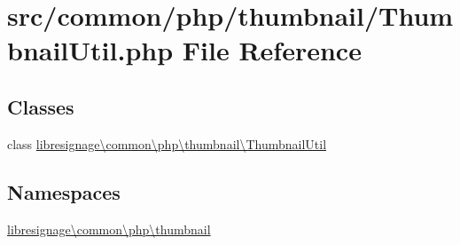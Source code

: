 \hypertarget{ThumbnailUtil_8php}{}\section{src/common/php/thumbnail/\+Thumbnail\+Util.php File Reference}
\label{ThumbnailUtil_8php}
\subsection*{Classes}
\begin{DoxyCompactItemize}
\item 
class \hyperlink{classlibresignage_1_1common_1_1php_1_1thumbnail_1_1ThumbnailUtil}{libresignage\textbackslash{}common\textbackslash{}php\textbackslash{}thumbnail\textbackslash{}\+Thumbnail\+Util}
\end{DoxyCompactItemize}
\subsection*{Namespaces}
\begin{DoxyCompactItemize}
\item 
 \hyperlink{namespacelibresignage_1_1common_1_1php_1_1thumbnail}{libresignage\textbackslash{}common\textbackslash{}php\textbackslash{}thumbnail}
\end{DoxyCompactItemize}
